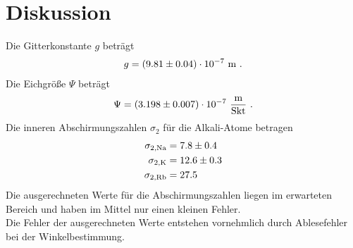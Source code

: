 \section{Diskussion}
\label{sec:Diskussion}
Die Gitterkonstante $g$ beträgt
\begin{align*}
  g = (\num{9.81 +- 0.04}) \cdot 10^{-7}\ \text{m} \ .
\end{align*}
Die Eichgröße $\Psi$ beträgt
\begin{align*}
  \Psi = (\num{3.198 +- 0.007}) \cdot 10^{-7}\ \frac{\text{m}}{\text{Skt}} \ .
\end{align*}
Die inneren Abschirmungszahlen $\sigma_2$ für die Alkali-Atome betragen
\begin{align*}
  \sigma_{2,\text{Na}} & = \num{7.8 +- 0.4} \\
  \sigma_{2,\text{K}}  & = \num{12.6 +- 0.3} \\
  \sigma_{2,\text{Rb}} & = 27.5
\end{align*}
Die ausgerechneten Werte für die Abschirmungszahlen liegen im erwarteten Bereich und haben im Mittel nur einen kleinen Fehler. \\
Die Fehler der ausgerechneten Werte entstehen vornehmlich durch Ablesefehler bei der Winkelbestimmung.
